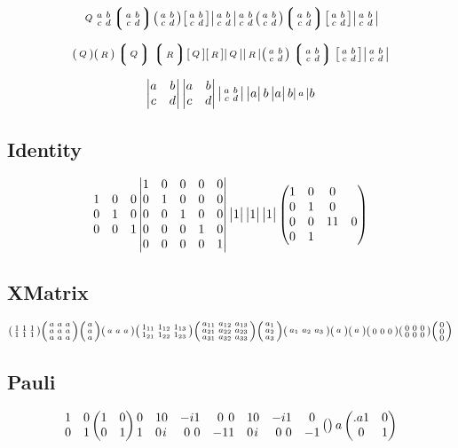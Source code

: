 \documentclass{article}
\begin{document}
\[
  \smallmatrixquantity{Q}
  \smallmatrixquantity*{a & b \\ c & d}
  \smallmatrixquantity*(a & b \\ c & d)
  \smallmatrixquantity(a & b \\ c & d)
  \smallmatrixquantity[a & b \\ c & d]
  \smallmatrixquantity|a & b \\ c & d|
  \smqty{a & b \\ c & d}
  \smqty(a & b \\ c & d)
  \smqty*(a & b \\ c & d)
  \smqty[a & b \\ c & d]
  \smqty|a & b \\ c & d|
\]

\[
  \spmqty{Q} \smqty(R)
  \sPmqty{Q} \smqty*(R)
  \sbmqty{Q} \smqty[R]
  \svmqty{Q} \smqty|R|
  \spmqty{a & b \\ c & d}
  \sPmqty{a & b \\ c & d}
  \sbmqty{a & b \\ c & d}
  \svmqty{a & b \\ c & d}
\]

\[
  \matrixdeterminant{a & b \\ c & d}
  \mdet{a & b \\ c & d}
  \smdet{a & b \\ c & d} 
  \matrixdeterminant a b
  \mdet a b
  \smdet a b
\]

\subsection*{Identity}
\[
  \mqty{\imat{3}}
  \vmqty{\imat{5}}
  \vmqty{\imat{0}}
  \vmqty{\imat{1}}
  \vmqty{\imat{-1}}
  \pmqty{\imat{3}\pmat{0}}
\]

\subsection*{XMatrix}
\[
  \smqty(\xmat{1}{2}{3})
  \smqty(\xmat{a}{3}{3}) 
  \smqty(\xmat{a}{3}{1}) 
  \smqty(\xmat{a}{1}{3})
  \smqty(\xmat*{1}{2}{3})
  \smqty(\xmat*{a}{3}{3})
  \smqty(\xmat*{a}{3}{1})
  \smqty(\xmat*{a}{1}{3})
  \smqty(\xmat*{a}{1}{1})
  \smqty(\xmat*{a}{-1}{-1})
  \smqty(\zmat{1}{3})
  \smqty(\zmat{2}{3})
  \smqty(\zmat{3}{1})
\]


\subsection*{Pauli}
\[
  \mqty{\pmat{0}}
  \pmqty{\pmat{0}}
  \mqty{\pmat{1}}
  \mqty{\pmat{2}}
  \mqty{\pmat{3}}
  \mqty{\pmat{4}}
  \mqty{\pmat{x}}
  \mqty{\pmat{y}}
  \mqty{\pmat{z}}
  \mqty{\pmat{a}}
  \pmqty{\pmat{a}}
  \mqty{\pmat{aa}}
  \pmqty{\pmat{0.a}}
\]
\end{document}
